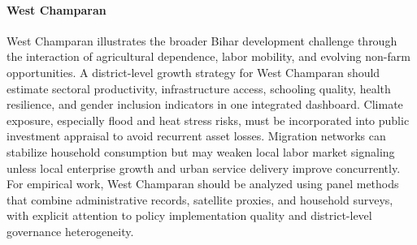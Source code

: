 \documentclass[preprint,12pt]{elsarticle}
\begin{document}
\paragraph{West Champaran} West Champaran illustrates the broader Bihar development challenge through the interaction of agricultural dependence, labor mobility, and evolving non-farm opportunities. A district-level growth strategy for West Champaran should estimate sectoral productivity, infrastructure access, schooling quality, health resilience, and gender inclusion indicators in one integrated dashboard. Climate exposure, especially flood and heat stress risks, must be incorporated into public investment appraisal to avoid recurrent asset losses. Migration networks can stabilize household consumption but may weaken local labor market signaling unless local enterprise growth and urban service delivery improve concurrently. For empirical work, West Champaran should be analyzed using panel methods that combine administrative records, satellite proxies, and household surveys, with explicit attention to policy implementation quality and district-level governance heterogeneity.



\end{document}
